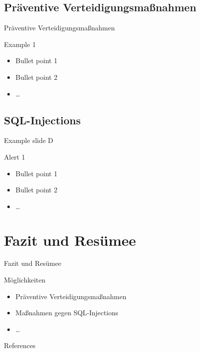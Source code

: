 \documentclass[18pt]{beamer}
\begin{document}
\subsection{Präventive Verteidigungsmaßnahmen}
\begin{frame}{Präventive Verteidigungsmaßnahmen}
\begin{exampleblock}{Example 1}
\begin{itemize}
\item Bullet point 1
\pause
\item Bullet point 2
\item \dots
\end{itemize}
\end{exampleblock}
\end{frame}

\subsection{SQL-Injections}
\begin{frame}{Example slide D}
\begin{alertblock}{Alert 1}
\begin{itemize}
\item Bullet point 1
\pause
\item Bullet point 2
\item \dots
\end{itemize}
\end{alertblock}
\end{frame}




\section{Fazit und Resümee}
\begin{frame}{Fazit und Resümee}
\begin{exampleblock}{Möglichkeiten}
\begin{itemize}
\item Präventive Verteidigungsmaßnahmen
\pause
\item Maßnahmen gegen SQL-Injections
\item \dots
\end{itemize}
\end{exampleblock}
\end{frame}



\appendix
\beginbackup

\begin{frame}[allowframebreaks]{References}
\printbibliography
\end{frame}

\backupend
\end{document}
